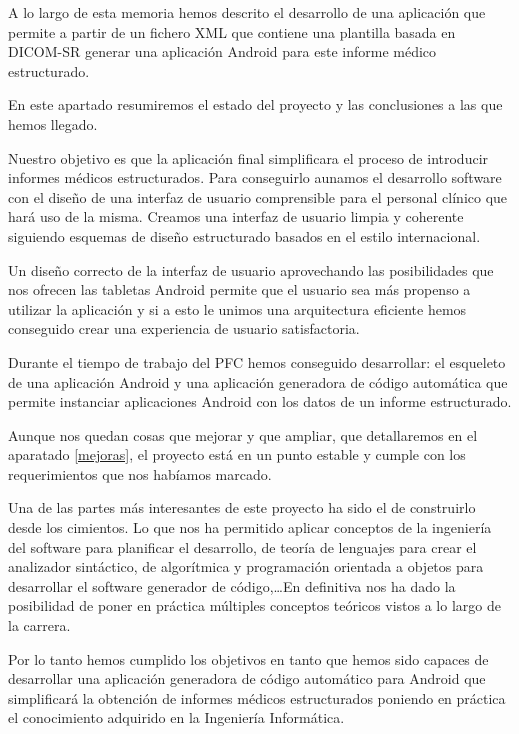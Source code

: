 A lo largo de esta memoria hemos descrito el desarrollo de una aplicación que permite a partir de un fichero XML que contiene una plantilla basada en DICOM-SR generar una aplicación Android para este informe médico estructurado.\par
En este apartado resumiremos el estado del proyecto y las conclusiones a las que hemos llegado.\medskip\par

Nuestro objetivo es que la aplicación final simplificara el proceso de introducir informes médicos estructurados.
Para conseguirlo aunamos el desarrollo software con el diseño de una interfaz de usuario comprensible para el personal clínico que hará uso de la misma. Creamos una interfaz  de usuario limpia y coherente siguiendo esquemas de diseño  estructurado basados en el estilo internacional. \par
Un diseño correcto de la interfaz de usuario aprovechando las posibilidades que nos ofrecen las tabletas Android permite que el usuario sea más propenso a utilizar la aplicación y si a esto le unimos una arquitectura eficiente hemos conseguido crear una experiencia de usuario satisfactoria.\medskip\par

Durante el tiempo de trabajo del PFC hemos conseguido desarrollar: el esqueleto de una aplicación Android y una aplicación generadora de código automática que permite instanciar aplicaciones Android con los datos de un informe estructurado.\par
Aunque nos quedan cosas que mejorar y que ampliar, que detallaremos en el aparatado \ref{mejoras}, el proyecto está en un punto estable y cumple con los requerimientos que nos habíamos marcado.\medskip\par

Una de las partes más interesantes de este proyecto ha sido el de construirlo desde los cimientos. Lo que nos ha permitido aplicar conceptos de la ingeniería del software para planificar el desarrollo, de teoría de lenguajes para crear el analizador sintáctico, de algorítmica y programación orientada a objetos para desarrollar el software generador de código,\ldots En definitiva nos ha dado la posibilidad de poner en práctica múltiples conceptos teóricos vistos a lo largo de la carrera.\medskip\par

Por lo tanto hemos cumplido los objetivos en tanto que hemos sido capaces de desarrollar una aplicación generadora de código automático para Android que simplificará la obtención de informes médicos estructurados poniendo en práctica el conocimiento adquirido en la Ingeniería Informática.\par

